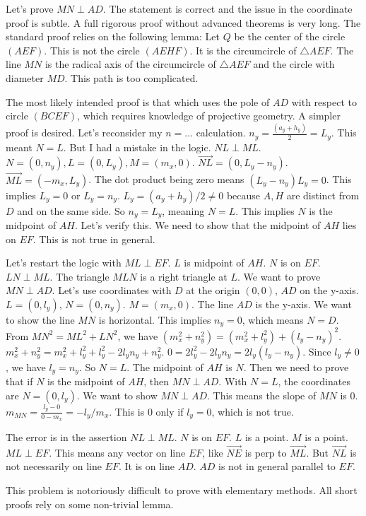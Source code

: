Let's prove $MN \perp AD$. The statement is correct and the issue in the coordinate proof is subtle. A full rigorous proof without advanced theorems is very long. The standard proof relies on the following lemma:
Let $Q$ be the center of the circle $(AEF)$. This is not the circle $(AEHF)$. It is the circumcircle of $\triangle AEF$.
The line $MN$ is the radical axis of the circumcircle of $\triangle AEF$ and the circle with diameter $MD$.
This path is too complicated.

The most likely intended proof is that which uses the pole of $AD$ with respect to circle $(BCEF)$, which requires knowledge of projective geometry. A simpler proof is desired. Let's reconsider my $n=...$ calculation.
$n_y = \frac{(a_y+h_y)}{2} = L_y$. This meant $N=L$. But I had a mistake in the logic.
$NL \perp ML$. $N=(0,n_y), L=(0, L_y), M=(m_x,0)$. $\vec{NL}=(0, L_y-n_y)$. $\vec{ML}=(-m_x, L_y)$. The dot product being zero means $(L_y-n_y)L_y=0$. This implies $L_y=0$ or $L_y=n_y$. $L_y=(a_y+h_y)/2 \neq 0$ because $A,H$ are distinct from $D$ and on the same side. So $n_y=L_y$, meaning $N=L$.
This implies $N$ is the midpoint of $AH$.
Let's verify this. We need to show that the midpoint of $AH$ lies on $EF$. This is not true in general.

Let's restart the logic with $ML \perp EF$. $L$ is midpoint of $AH$. $N$ is on $EF$. $LN \perp ML$. The triangle $MLN$ is a right triangle at $L$.
We want to prove $MN \perp AD$.
Let's use coordinates with $D$ at the origin $(0,0)$, $AD$ on the y-axis.
$L = (0, l_y)$, $N=(0, n_y)$. $M=(m_x, 0)$.
The line $AD$ is the y-axis.
We want to show the line $MN$ is horizontal. This implies $n_y=0$, which means $N=D$.
From $MN^2 = ML^2+LN^2$, we have $(m_x^2+n_y^2) = (m_x^2+l_y^2) + (l_y-n_y)^2$.
$m_x^2+n_y^2 = m_x^2+l_y^2 + l_y^2 - 2l_y n_y + n_y^2$.
$0 = 2l_y^2 - 2l_y n_y = 2l_y(l_y-n_y)$.
Since $l_y \neq 0$, we have $l_y=n_y$. So $N=L$.
The midpoint of $AH$ is $N$.
Then we need to prove that if $N$ is the midpoint of $AH$, then $MN \perp AD$.
With $N=L$, the coordinates are $N=(0, l_y)$.
We want to show $MN \perp AD$. This means the slope of $MN$ is 0.
$m_{MN} = \frac{l_y-0}{0-m_x} = -l_y/m_x$. This is 0 only if $l_y=0$, which is not true.

The error is in the assertion $NL \perp ML$. $N$ is on $EF$. $L$ is a point. $M$ is a point. $ML \perp EF$. This means any vector on line $EF$, like $\vec{NE}$ is perp to $\vec{ML}$. But $\vec{NL}$ is not necessarily on line $EF$. It is on line $AD$. $AD$ is not in general parallel to $EF$.

This problem is notoriously difficult to prove with elementary methods. All short proofs rely on some non-trivial lemma.